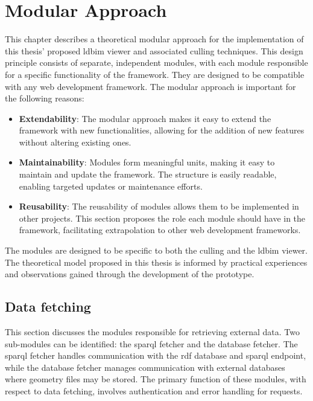 \chapter{Modular Approach} \label{ch:modularApproach}

This chapter describes a theoretical modular approach for the implementation of this thesis' proposed \ac{ldbim} viewer and associated culling techniques. This design principle consists of separate, independent modules, with each module responsible for a specific functionality of the framework. They are designed to be compatible with any web development framework. The modular approach is important for the following reasons:

\begin{itemize}
  \item \textbf{Extendability}: The modular approach makes it easy to extend the framework with new functionalities, allowing for the addition of new features without altering existing ones.
  \item \textbf{Maintainability}: Modules form meaningful units, making it easy to maintain and update the framework. The structure is easily readable, enabling targeted updates or maintenance efforts.
  \item \textbf{Reusability}: The reusability of modules allows them to be implemented in other projects. This section proposes the role each module should have in the framework, facilitating extrapolation to other web development frameworks.
\end{itemize}

The modules are designed to be specific to both the culling and the \ac{ldbim} viewer. The theoretical model proposed in this thesis is informed by practical experiences and observations gained through the development of the prototype.

\section{Data fetching}
This section discusses the modules responsible for retrieving external data. Two sub-modules can be identified: the \ac{sparql} fetcher and the database fetcher. The \ac{sparql} fetcher handles communication with the \ac{rdf} database and \ac{sparql} endpoint, while the database fetcher manages communication with external databases where geometry files may be stored. The primary function of these modules, with respect to data fetching, involves authentication and error handling for requests.

